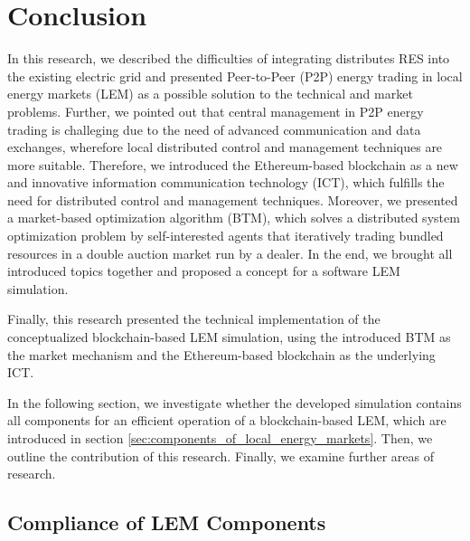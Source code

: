 \section{Conclusion}
In this research, we described the difficulties of integrating distributes RES into 
the existing electric grid and presented Peer-to-Peer (P2P) energy trading in local energy markets (LEM)
as a possible solution to the technical and market problems. Further, we pointed out that central
management in P2P energy trading is challeging due to the need of advanced communication and data exchanges,
wherefore local distributed control and management techniques are more suitable.
Therefore, we introduced the Ethereum-based blockchain as a new and innovative information communication
technology (ICT), which fulfills the need for distributed control and management techniques.
Moreover, we presented a market-based optimization algorithm (BTM), which solves a distributed system
optimization problem by self-interested agents that iteratively trading bundled resources in a double
auction market run by a dealer. 
In the end, we brought all introduced topics together and proposed a concept for a software 
LEM simulation.

Finally, this research presented the technical implementation of the conceptualized blockchain-based
LEM simulation, using the introduced BTM as the market mechanism and 
the Ethereum-based blockchain as the underlying ICT.

In the following section, we investigate whether the developed simulation contains all 
components for an efficient operation of a blockchain-based LEM, which are introduced in section \ref{sec:components_of_local_energy_markets}. 
Then, we outline the contribution of this research. Finally, we examine further areas of research.

\subsection{Compliance of LEM Components}
\label{sec:compliance_of_components}

